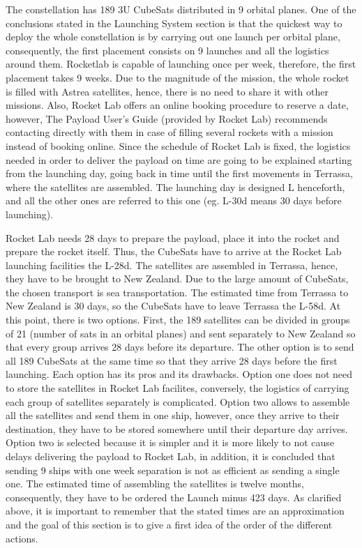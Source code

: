 The constellation has 189 3U CubeSats distributed in 9 orbital planes. One of the conclusions stated in the Launching System section  is that the quickest way to deploy the whole constellation is by carrying out one launch per orbital plane, consequently, the first placement consists on 9 launches and all the logistics around them. Rocketlab is capable of launching once per week, therefore, the first placement takes 9 weeks. Due to the magnitude of the mission, the whole rocket is filled with Astrea satellites, hence, there is no need to share it with other missions. Also, Rocket Lab offers an online booking procedure to reserve a date, however, The Payload User's Guide (provided by Rocket Lab) recommends contacting directly with them in case of filling several rockets with a mission instead of booking online.  
\newline
Since the schedule of Rocket Lab is fixed, the logistics needed in order to deliver the payload on time are going to be explained starting from the launching day, going back in time until the first movements in Terrassa, where the satellites are assembled. 
The launching day is designed L henceforth, and all the other ones are referred to this one (eg. L-30d means 30 days before launching). 


Rocket Lab needs 28 days to prepare the payload, place it into the rocket and prepare the rocket itself. Thus, the CubeSats have to arrive at the Rocket Lab launching facilities the L-28d. The satellites are assembled in Terrassa, hence, they have to be brought to New Zealand. Due to the large amount of CubeSats, the chosen transport is sea transportation. The estimated time from Terrassa to New Zealand is 30 days, so the CubeSats have to leave Terrassa the L-58d. At this point, there is two options. First, the 189 satellites can be divided in groups of 21 (number of sats in an orbital planes) and sent separately to New Zealand so that every group arrives 28 days before its departure. The other option is to send all 189 CubeSats at the same time so that they arrive 28 days before the first launching. Each option has its pros and its drawbacks. Option one does not need to store the satellites in Rocket Lab facilites, conversely, the logistics of carrying each group of satellites separately is complicated. Option two allows to assemble all the satellites and send them in one ship, however, once they arrive to their destination, they have to be stored somewhere until their departure day arrives. Option two is selected because it is simpler and it is more likely to not cause delays delivering the payload to Rocket Lab, in addition, it is concluded that sending 9 ships with one week separation is not as efficient as sending a single one. 
\newline
The estimated time of assembling the satellites is twelve months, consequently, they have to be ordered the Launch minus 423 days. 
\newline
As clarified above, it is important to remember that the stated times are an approximation and the goal of this section is to give a first idea of the order of the different actions. 

